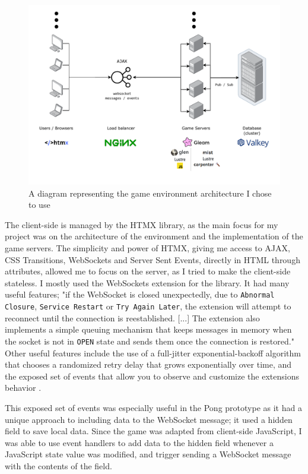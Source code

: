 \documentclass[]{final}
\begin{document}
\begin{figure}[ht!]
  \centering
  \includegraphics[width=\linewidth]{architecture}
  \vspace*{-1.5cm}
  \caption{A diagram representing the game environment architecture I chose to use}
  \label{fig: 3}
\end{figure}

\newpage

The client-side is managed by the HTMX library, as the main focus for my project
was on the architecture of the environment and the implementation of the game
servers. The simplicity and power of HTMX, giving me access to AJAX, CSS Transitions,
WebSockets and Server Sent Events, directly in HTML through attributes,\cite{noauthor_HTMX_nodate} allowed me to
focus on the server, as I tried to make the client-side stateless. I mostly
used the WebSockets extension for the library. It had many useful features;
"if the WebSocket is closed unexpectedly, due to \lstinline|Abnormal Closure|, \lstinline|Service Restart|
or \lstinline|Try Again Later|, the extension will attempt to reconnect until the connection
is reestablished. [...] The extension also implements a simple queuing mechanism that
keeps messages in memory when the socket is not in \lstinline|OPEN| state and sends
them once the connection is restored."\cite{noauthor_HTMX_ws_nodate} Other useful features include the
use of a full-jitter exponential-backoff algorithm that chooses a randomized
retry delay that grows exponentially over time, and the exposed
set of events that allow you to observe and customize the extensions behavior
\cite{noauthor_HTMX_ws_nodate}.

This exposed set of events was especially useful in the Pong prototype as
it had a unique approach to including data to the WebSocket message; it used
a hidden field to save local data. Since the game was adapted from
client-side JavaScript, I was able to use event handlers to add data to the
hidden field whenever a JavaScript state value was modified, and trigger
sending a WebSocket message with the contents of the field.
\end{document}

